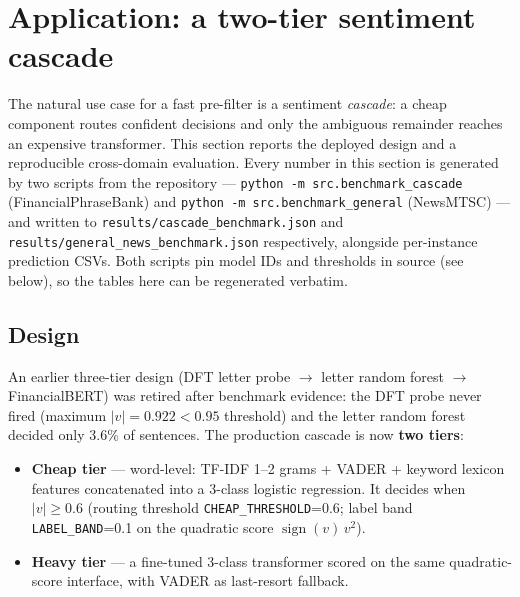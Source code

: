 \documentclass{article}
\begin{document}
\section{Application: a two-tier sentiment cascade}

The natural use case for a fast pre-filter is a sentiment \emph{cascade}: a cheap
component routes confident decisions and only the ambiguous remainder reaches an
expensive transformer. This section reports the deployed design and a
reproducible cross-domain evaluation. Every number in this section is generated
by two scripts from the repository --- \texttt{python -m src.benchmark\_cascade}
(FinancialPhraseBank) and \texttt{python -m src.benchmark\_general} (NewsMTSC)
--- and written to \texttt{results/cascade\_benchmark.json} and
\texttt{results/general\_news\_benchmark.json} respectively, alongside
per-instance prediction CSVs. Both scripts pin model IDs and thresholds in
source (see below), so the tables here can be regenerated verbatim.

\subsection{Design}

An earlier three-tier design (DFT letter probe $\rightarrow$ letter random forest
$\rightarrow$ FinancialBERT) was retired after benchmark evidence: the DFT probe
never fired (maximum $|v| = 0.922 < 0.95$ threshold) and the letter random forest
decided only 3.6\% of sentences. The production cascade is now \textbf{two tiers}:

\begin{itemize}
\item \textbf{Cheap tier} --- word-level: TF-IDF 1--2 grams + VADER + keyword
  lexicon features concatenated into a 3-class logistic regression. It decides
  when $|v| \geq 0.6$ (routing threshold \texttt{CHEAP\_THRESHOLD}=0.6; label
  band \texttt{LABEL\_BAND}=0.1 on the quadratic score
  $\operatorname{sign}(v)\,v^2$).
\item \textbf{Heavy tier} --- a fine-tuned 3-class transformer scored on the
  same quadratic-score interface, with VADER as last-resort fallback.
\end{itemize}
\end{document}
